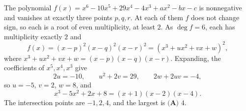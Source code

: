 The polynomial $f(x)=x^6-10x^5+29x^4-4x^3+ax^2-bx-c$ is nonnegative and vanishes at exactly three points $p,q,r$. At each of them $f$ does not change sign, so each is a root of even multiplicity, at least $2$. As $\deg f=6$, each has multiplicity exactly $2$ and
\[f(x)=(x-p)^2(x-q)^2(x-r)^2=\left(x^3+ux^2+vx+w\right)^2,\]
where $x^3+ux^2+vx+w=(x-p)(x-q)(x-r)$. Expanding, the coefficients of $x^5,x^4,x^3$ give
\[2u=-10,\qquad u^2+2v=29,\qquad2w+2uv=-4,\]
so $u=-5$, $v=2$, $w=8$, and
\[x^3-5x^2+2x+8=(x+1)(x-2)(x-4).\]
The intersection points are $-1,2,4$, and the largest is $\boxed{\textbf{(A) }4}$.
